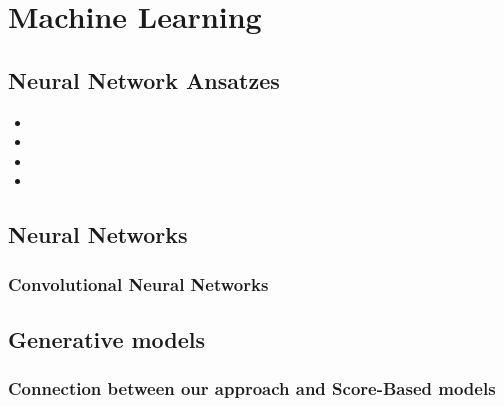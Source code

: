 
\chapter{Machine Learning}
\label{chapter4}

\ifpdf
\graphicspath{{Chapter4/Figs/Raster/}{Chapter4/Figs/PDF/}{Chapter4/Figs/}}
\else
\graphicspath{{Chapter4/Figs/Vector/}{Chapter4/Figs/}}
\fi

\section{Neural Network Ansatzes}
\begin{itemize}
	\item
	\item
	\item
	\item
\end{itemize}

\section{Neural Networks}

\subsection{Convolutional Neural Networks}
\label{subsubsec:ml-cnn}

\section{Generative models}
\subsection{Connection between our approach and Score-Based models}